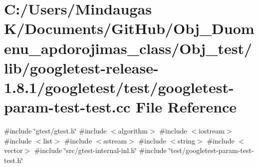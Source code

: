 \hypertarget{_obj__test_2lib_2googletest-release-1_88_81_2googletest_2test_2googletest-param-test-test_8cc}{}\section{C\+:/\+Users/\+Mindaugas K/\+Documents/\+Git\+Hub/\+Obj\+\_\+\+Duomenu\+\_\+apdorojimas\+\_\+class/\+Obj\+\_\+test/lib/googletest-\/release-\/1.8.1/googletest/test/googletest-\/param-\/test-\/test.cc File Reference}
\label{_obj__test_2lib_2googletest-release-1_88_81_2googletest_2test_2googletest-param-test-test_8cc}
{\ttfamily \#include \char`\"{}gtest/gtest.\+h\char`\"{}}\newline
{\ttfamily \#include $<$algorithm$>$}\newline
{\ttfamily \#include $<$iostream$>$}\newline
{\ttfamily \#include $<$list$>$}\newline
{\ttfamily \#include $<$sstream$>$}\newline
{\ttfamily \#include $<$string$>$}\newline
{\ttfamily \#include $<$vector$>$}\newline
{\ttfamily \#include \char`\"{}src/gtest-\/internal-\/inl.\+h\char`\"{}}\newline
{\ttfamily \#include \char`\"{}test/googletest-\/param-\/test-\/test.\+h\char`\"{}}\newline
